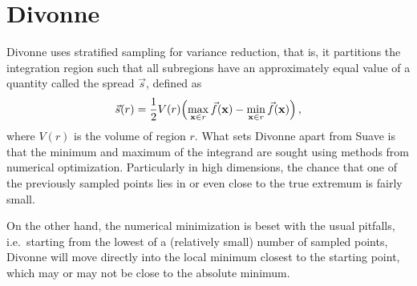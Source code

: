 \documentclass[12pt]{article}
\newcommand\ie{i.e.\ }
\newcommand\cvec[1]{\vec #1}
\newcommand\dvec[1]{\mathbf{#1}}
\begin{document}
\section{Divonne}

Divonne uses stratified sampling for variance reduction, that is, it 
partitions the integration region such that all subregions have an 
approximately equal value of a quantity called the spread $\cvec s$,
defined as
\begin{equation}
\cvec s(r) = \frac 12 V(r)
  \Bigl(\max_{\dvec x\in r} \cvec f(\dvec x) - 
        \min_{\dvec x\in r} \cvec f(\dvec x)\Bigr)\,,
\end{equation}
where $V(r)$ is the volume of region $r$.  What sets Divonne apart from
Suave is that the minimum and maximum of the integrand are sought using
methods from numerical optimization.  Particularly in high dimensions, 
the chance that one of the previously sampled points lies in or even 
close to the true extremum is fairly small.

On the other hand, the numerical minimization is beset with the usual
pitfalls, \ie starting from the lowest of a (relatively small) number of
sampled points, Divonne will move directly into the local minimum
closest to the starting point, which may or may not be close to the
absolute minimum.
\end{document}
